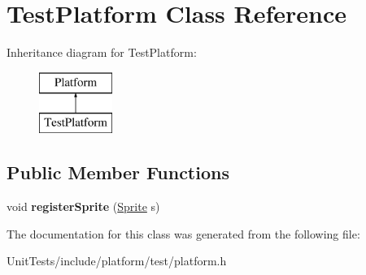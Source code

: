 \hypertarget{class_test_platform}{\section{Test\-Platform Class Reference}
\label{class_test_platform}
}
Inheritance diagram for Test\-Platform\-:\begin{figure}[H]
\begin{center}
\leavevmode
\includegraphics[height=2.000000cm]{class_test_platform}
\end{center}
\end{figure}
\subsection*{Public Member Functions}
\begin{DoxyCompactItemize}
\item 
\hypertarget{class_test_platform_ad20f3c7467d6bee028cfc55bf437fd11}{void {\bfseries register\-Sprite} (\hyperlink{class_sprite}{Sprite} s)}\label{class_test_platform_ad20f3c7467d6bee028cfc55bf437fd11}

\end{DoxyCompactItemize}


The documentation for this class was generated from the following file\-:\begin{DoxyCompactItemize}
\item 
Unit\-Tests/include/platform/test/platform.\-h\end{DoxyCompactItemize}
